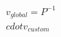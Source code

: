 \documentclass[preview]{standalone}
\begin{document}
\begin{align*}
v_{global} = P^{-1} \\cdot v_{custom}
\end{align*}
\end{document}

